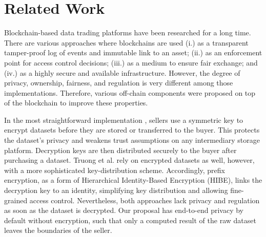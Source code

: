 \chapter{Related Work}
\label{cha:relatedwork}

Blockchain-based data trading platforms have been researched for a long time. There are various approaches where blockchains are used (i.) as a transparent tamper-proof log of events and immutable link to an asset; (ii.) as an enforcement point for access control decisions; (iii.) as a medium to ensure fair exchange; and (iv.) as a highly secure and available infrastructure. However, the degree of privacy, ownership, fairness, and regulation is very different among those implementations. Therefore, various off-chain components were proposed on top of the blockchain to improve these properties.





In the most straightforward implementation \cite{ozyilmazIDMoBIoTData2018,banerjeeBlockchainEnabledData2019}, sellers use a symmetric key to encrypt datasets before they are stored or transferred to the buyer. This protects the dataset's privacy and weakens trust assumptions on any intermediary storage platform. Decryption keys are then distributed securely to the buyer after purchasing a dataset. Truong et al. \cite{truongSecureDecentralizedSharing2019} rely on encrypted datasets as well, however, with a more sophisticated key-distribution scheme. Accordingly, prefix encryption, as a form of Hierarchical Identity-Based Encryption (HIBE), links the decryption key to an identity, simplifying key distribution and allowing fine-grained access control. Nevertheless, both approaches lack privacy and regulation as soon as the dataset is decrypted. Our proposal has end-to-end privacy by default without encryption, such that only a computed result of the raw dataset leaves the boundaries of the seller. 

